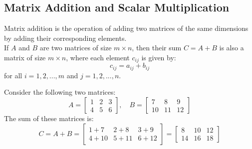 \subsection{Matrix Addition and Scalar Multiplication}
\begin{definition}
    Matrix addition is the operation of adding two matrices of the same dimensions by adding their corresponding elements. \\
    If \( A \) and \( B \) are two matrices of size \( m \times n \), then their sum \( C = A + B \) is also a matrix of size \( m \times n \), where each element \( c_{ij} \) is given by:
    \[
        c_{ij} = a_{ij} + b_{ij}
    \]
    for all \( i = 1, 2, ..., m \) and \( j = 1, 2, ..., n \).
\end{definition}
\begin{eg}
    Consider the following two matrices:
    \[
        A = 
        \begin{bmatrix}
            1 & 2 & 3 \\
            4 & 5 & 6
        \end{bmatrix}
        , \quad
        B = 
        \begin{bmatrix}
            7 & 8 & 9 \\
            10 & 11 & 12
        \end{bmatrix}
    \]
    The sum of these matrices is:
    \[
        C = A + B = 
        \begin{bmatrix}
            1+7 & 2+8 & 3+9 \\
            4+10 & 5+11 & 6+12
        \end{bmatrix}
        = 
        \begin{bmatrix}
            8 & 10 & 12 \\
            14 & 16 & 18
        \end{bmatrix}
    \]
\end{eg}

